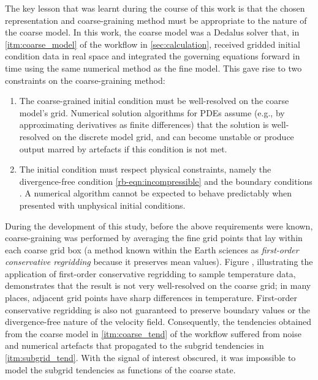 \documentclass[../main.tex]{subfiles}
\begin{document}
The key lesson that was learnt during the course of this work is that the
chosen representation and coarse-graining method must be appropriate to the
nature of the coarse model. In this work, the coarse model was a Dedalus solver
that, in \cref{itm:coarse_model} of the workflow in \cref{sec:calculation},
received gridded initial condition data in real space and integrated the
governing equations forward in time using the same numerical method as the
fine model. This gave rise to two constraints on the coarse-graining method:
\begin{enumerate}
    \item The coarse-grained initial condition must be well-resolved on the
        coarse model's grid. Numerical solution algorithms for PDEs assume
        (e.g., by approximating derivatives as finite differences) that the
        solution is well-resolved on the discrete model grid, and can become
        unstable or produce output marred by artefacts if this condition is not
        met.
    \item The initial condition must respect physical constraints, namely the
        divergence-free condition \cref{rb-eqn:incompressible} and the boundary
        conditions . A numerical
        algorithm cannot be expected to behave predictably when presented with
        unphysical initial conditions.
\end{enumerate}

During the development of this study, before the above requirements were known,
coarse-graining was performed by averaging the fine grid points that lay within
each coarse grid box (a method known within the Earth sciences as
\emph{first-order conservative regridding} because it preserves mean values).
Figure , illustrating the
application of first-order conservative regridding to sample temperature data,
demonstrates that the result is not very well-resolved on the coarse grid; in
many places, adjacent grid points have sharp differences in temperature.
First-order conservative regridding is also not guaranteed to preserve boundary
values or the divergence-free nature of the velocity field. Consequently, the
tendencies obtained from the coarse model in \cref{itm:coarse_tend} of the
workflow suffered from noise and numerical artefacts that propagated to
the subgrid tendencies in \cref{itm:subgrid_tend}. With the signal of interest
obscured, it was impossible to model the subgrid tendencies as functions of
the coarse state.
\end{document}
